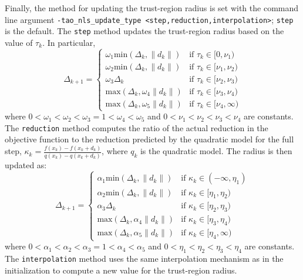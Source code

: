Finally, the method for updating the trust-region radius is set with the 
command line argument 
{\tt -tao\_nls\_update\_type <step,reduction,interpolation>}; {\tt step} 
is the default.  The {\tt step} method updates the trust-region 
radius based on the value of $\tau_k$.  In particular,
\[
\Delta_{k+1} = \left\{\begin{array}{ll}
\omega_1 \mbox{min}(\Delta_k, \|d_k\|) & \mbox{if } \tau_k \in [0, \nu_1) \\
\omega_2 \mbox{min}(\Delta_k, \|d_k\|) & \mbox{if } \tau_k \in [\nu_1, \nu_2) \\
\omega_3 \Delta_k & \mbox{if } \tau_k \in [\nu_2, \nu_3) \\
\mbox{max}(\Delta_k, \omega_4 \|d_k\|) & \mbox{if } \tau_k \in [\nu_3, \nu_4) \\
\mbox{max}(\Delta_k, \omega_5 \|d_k\|) & \mbox{if } \tau_k \in [\nu_4, \infty)
\end{array}
\right.
\]
where $0 < \omega_1 < \omega_2 < \omega_3 = 1 < \omega_4 < \omega_5$ and
$0 < \nu_1 < \nu_2 < \nu_3 < \nu_4$ are constants.  The {\tt reduction} 
method computes the ratio of the actual reduction in the objective function 
to the reduction predicted by the quadratic model for the full step, 
$\kappa_k = \frac{f(x_k) - f(x_k + d_k)}{q(x_k) - q(x_k + d_k)}$, where 
$q_k$ is the quadratic model.  The radius is then updated as:
\[
\Delta_{k+1} = \left\{\begin{array}{ll}
\alpha_1 \mbox{min}(\Delta_k, \|d_k\|) & \mbox{if } \kappa_k \in (-\infty, \eta_1) \\
\alpha_2 \mbox{min}(\Delta_k, \|d_k\|) & \mbox{if } \kappa_k \in [\eta_1, \eta_2) \\
\alpha_3 \Delta_k & \mbox{if } \kappa_k \in [\eta_2, \eta_3) \\
\mbox{max}(\Delta_k, \alpha_4 \|d_k\|) & \mbox{if } \kappa_k \in [\eta_3, \eta_4) \\
\mbox{max}(\Delta_k, \alpha_5 \|d_k\|) & \mbox{if } \kappa_k \in [\eta_4, \infty)
\end{array}
\right.
\]
where $0 < \alpha_1 < \alpha_2 < \alpha_3 = 1 < \alpha_4 < \alpha_5$ and
$0 < \eta_1 < \eta_2 < \eta_3 < \eta_4$ are constants.  The {\tt interpolation}
method uses the same interpolation mechanism as in the initialization to
compute a new value for the trust-region radius.

